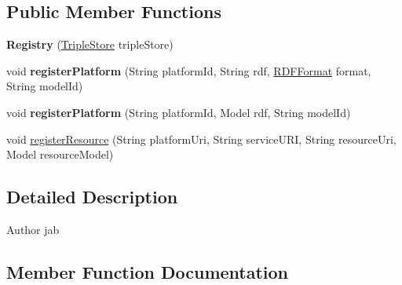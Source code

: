 \subsection*{Public Member Functions}
\begin{DoxyCompactItemize}
\item 
{\bfseries Registry} (\hyperlink{classeu_1_1h2020_1_1symbiote_1_1ontology_1_1model_1_1TripleStore}{Triple\+Store} triple\+Store)\hypertarget{classeu_1_1h2020_1_1symbiote_1_1ontology_1_1model_1_1Registry_adcb1239b65bdcd80fb3fec88faa9fcb6}{}\label{classeu_1_1h2020_1_1symbiote_1_1ontology_1_1model_1_1Registry_adcb1239b65bdcd80fb3fec88faa9fcb6}

\item 
void {\bfseries register\+Platform} (String platform\+Id, String rdf, \hyperlink{enumeu_1_1h2020_1_1symbiote_1_1ontology_1_1model_1_1RDFFormat}{R\+D\+F\+Format} format, String model\+Id)\hypertarget{classeu_1_1h2020_1_1symbiote_1_1ontology_1_1model_1_1Registry_aba2012524676d2d17db541224e3e1183}{}\label{classeu_1_1h2020_1_1symbiote_1_1ontology_1_1model_1_1Registry_aba2012524676d2d17db541224e3e1183}

\item 
void {\bfseries register\+Platform} (String platform\+Id, Model rdf, String model\+Id)\hypertarget{classeu_1_1h2020_1_1symbiote_1_1ontology_1_1model_1_1Registry_a894d145edea63836ff08ab1d05cc07da}{}\label{classeu_1_1h2020_1_1symbiote_1_1ontology_1_1model_1_1Registry_a894d145edea63836ff08ab1d05cc07da}

\item 
void \hyperlink{classeu_1_1h2020_1_1symbiote_1_1ontology_1_1model_1_1Registry_a0f3f23b348b9033439e8553a4522b8a8}{register\+Resource} (String platform\+Uri, String service\+U\+RI, String resource\+Uri, Model resource\+Model)
\end{DoxyCompactItemize}


\subsection{Detailed Description}
\begin{DoxyAuthor}{Author}
jab 
\end{DoxyAuthor}


\subsection{Member Function Documentation}
